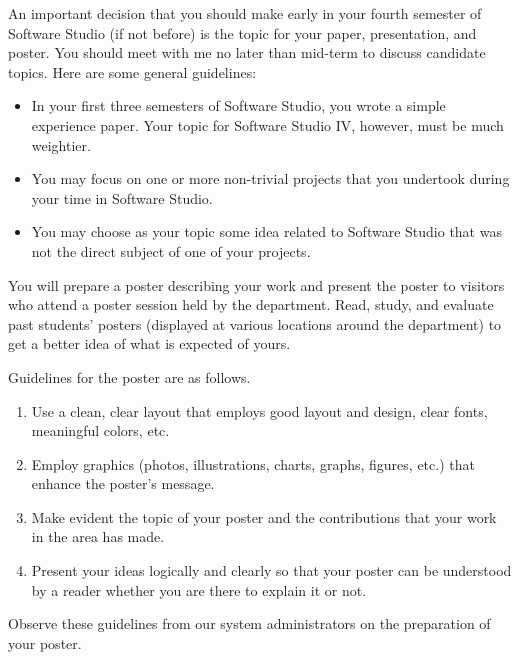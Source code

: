 \documentclass{article}
\begin{document}
An important decision that you should make early in your fourth semester of Software
Studio (if not before) is the topic for your paper, presentation, and poster.
You should meet with me no later than mid-term to discuss candidate topics.
Here are some general guidelines:

\begin{itemize}
\item In your first three semesters of Software Studio, you wrote a simple experience paper.
Your topic for Software Studio IV, however, must be much weightier.
\item You may focus on one or more non-trivial projects that you undertook
during your time in Software Studio.
\item You may choose as your topic some idea related to Software Studio that was not the
direct subject of one of your projects.
\end{itemize}

You will prepare a poster describing your work and present the poster to visitors who
attend a poster session held by the department. Read, study, and evaluate past students'
posters (displayed at various locations around the department) to get a better idea of
what is expected of yours.

Guidelines for the poster are as follows.

\begin{enumerate}
\item Use a clean, clear layout that employs good layout and design, clear fonts, meaningful
colors, etc.
\item Employ graphics (photos, illustrations, charts, graphs, figures, etc.) that enhance the
poster's message.
\item Make evident the topic of your poster and the contributions that your work in the area
has made.
\item Present your ideas logically and clearly so that your poster can be understood by a
reader whether you are there to explain it or not.
\end{enumerate}

Observe these guidelines from our system administrators on the preparation of your poster.
\end{document}
